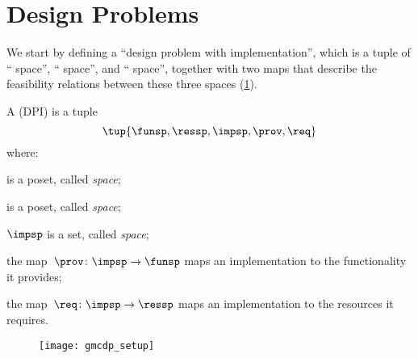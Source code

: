 

\section{Design Problems}
\label{sec:Design-Problems}

We start by defining a ``design problem with implementation'', which is a tuple of `` space'', `` space'', and `` space'', together with two maps that describe the feasibility relations between these three spaces (\cref{fig:setup}).

\begin{definition}
    \label{def:DPI}
    A \emph{} (DPI) is a tuple
    \begin{equation}
        \tup{\funsp, \ressp, \impsp, \prov,\req}
    \end{equation}
    where:

    \begin{compactitem}
        \item \funsp is a poset, called \emph{ space};
        \item \ressp is a poset, called \emph{ space};
        \item $\impsp$ is a set, called \emph{ space};
        \item the map~$\prov\colon\impsp\rightarrow\funsp$
        maps an implementation to the functionality it provides;
        \item the map~$\req\colon\impsp\rightarrow\ressp$
        maps an implementation to the resources it requires.
    \end{compactitem}

    \begin{figure}[h]
        \begin{center}
            \texttt{[image: gmcdp\_setup]}
        \end{center}
        \caption{\label{fig:setup}}
    \end{figure}
\end{definition}

